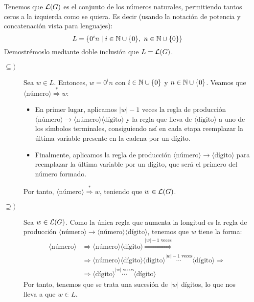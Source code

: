 \begin{ejercicio}
\begin{enumerate}
        Tenemos que $\mathcal{L}(G)$ es el conjunto de los números naturales, permitiendo
        tantos ceros a la izquierda como se quiera. Es decir (usando la notación de potencia y concatenación vista para lenguajes):
        \begin{equation*}
            L = \{0^i n \mid i\in \mathbb{N}\cup\{0\},~n\in \mathbb{N}\cup \{0\}\}
        \end{equation*}
        Demostrémoslo mediante doble inclusión que $L=\mathcal{L}(G)$.
        \begin{description}
            \item[$\subseteq)$] Sea $w\in L$. Entonces, $w=0^i n$ con $i\in \mathbb{N}\cup\{0\}$ y $n\in \mathbb{N}\cup \{0\}$. Veamos que
            $\langle \text{número} \rangle \stackrel{\ast}{\Longrightarrow} w$:
            \begin{itemize}
                \item En primer lugar, aplicamos $|w|-1$ veces la regla de producción $\langle \text{número} \rangle \rightarrow \langle \text{número} \rangle \langle \text{dígito} \rangle$ y la regla
                que lleva de $\langle \text{dígito} \rangle$ a uno de los símbolos terminales, consiguiendo así en cada etapa reemplazar
                la última variable presente en la cadena por un dígito.
                \item Finalmente, aplicamos la regla de producción $\langle \text{número} \rangle \rightarrow \langle \text{dígito} \rangle$ para reemplazar la última variable por un dígito, que será el primero del número formado.
            \end{itemize}
            Por tanto, $\langle \text{número} \rangle \stackrel{\ast}{\Longrightarrow} w$, teniendo que $w\in \mathcal{L}(G)$.

            \item[$\supseteq)$] Sea $w\in\mathcal{L}(G)$. Como la única regla que
            aumenta la longitud es la regla de producción $\langle \text{número} \rangle \rightarrow \langle \text{número} \rangle \langle \text{dígito} \rangle$, tenemos que $w$ tiene la forma:
            \begin{align*}
                \langle \text{número} \rangle &\Longrightarrow \langle \text{número} \rangle \langle \text{dígito} \rangle \stackrel{|w|-1\text{\ veces}}{\Longrightarrow} \\
                &\Longrightarrow
                \langle \text{número} \rangle \langle \text{dígito} \rangle \langle \text{dígito} \rangle \stackrel{|w|-1\text{\ veces}}{\cdots} \langle \text{dígito} \rangle
                \Longrightarrow \\& \Longrightarrow
                \langle \text{dígito} \rangle \stackrel{|w|\text{\ veces}}{\cdots} \langle \text{dígito} \rangle
            \end{align*}
            Por tanto, tenemos que se trata una sucesión de $|w|$ dígitos, lo que nos lleva a que $w\in L$.
        \end{description}


\end{enumerate}
\end{ejercicio}
